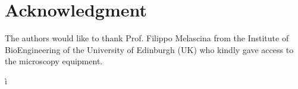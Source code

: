 \documentclass[conference]{IEEEtran}
\begin{document}
%



\section*{Acknowledgment}
The authors would like to thank Prof. Filippo Melascina from the Institute of BioEngineering of the University of Edinburgh (UK) who kindly gave access to the microscopy equipment.


\ifCLASSOPTIONcaptionsoff
  \newpage
\fi



 ì%

\end{document}
